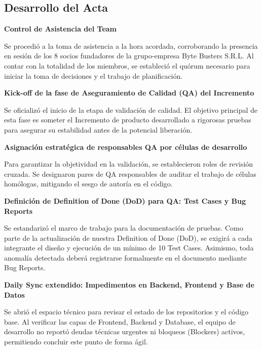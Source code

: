 \newpage
\subsection{Desarrollo del Acta}

\noindent \textbf{Control de Asistencia del Team}\par
Se procedió a la toma de asistencia a la hora acordada, corroborando la presencia en sesión de los 8 socios fundadores de la grupo-empresa Byte Busters S.R.L. Al contar con la totalidad de los miembros, se estableció el quórum necesario para iniciar la toma de decisiones y el trabajo de planificación.

\vspace*{0.5cm}
\noindent \textbf{Kick-off de la fase de Aseguramiento de Calidad (QA) del Incremento}\par
Se oficializó el inicio de la etapa de validación de calidad. El objetivo principal de esta fase es someter el Incremento de producto desarrollado a rigorosas pruebas para asegurar su estabilidad antes de la potencial liberación.

\vspace*{0.5cm}
\noindent \textbf{Asignación estratégica de responsables QA por células de desarrollo}\par
Para garantizar la objetividad en la validación, se establecieron roles de revisión cruzada. Se designaron pares de QA responsables de auditar el trabajo de células homólogas, mitigando el sesgo de autoría en el código.

\vspace*{0.5cm}
\noindent \textbf{Definición de Definition of Done (DoD) para QA: Test Cases y Bug Reports}\par
Se estandarizó el marco de trabajo para la documentación de pruebas. Como parte de la actualización de nuestra Definition of Done (DoD), se exigirá a cada integrante el diseño y ejecución de un mínimo de 10 Test Cases. Asimismo, toda anomalía detectada deberá registrarse formalmente en el documento mediante Bug Reports.

\vspace*{0.5cm}
\noindent \textbf{Daily Sync extendido: Impedimentos en Backend, Frontend y Base de Datos}\par
Se abrió el espacio técnico para revisar el estado de los repositorios y el código base. Al verificar las capas de Frontend, Backend y Database, el equipo de desarrollo no reportó deudas técnicas urgentes ni bloqueos (Blockers) activos, permitiendo concluir este punto de forma ágil.


